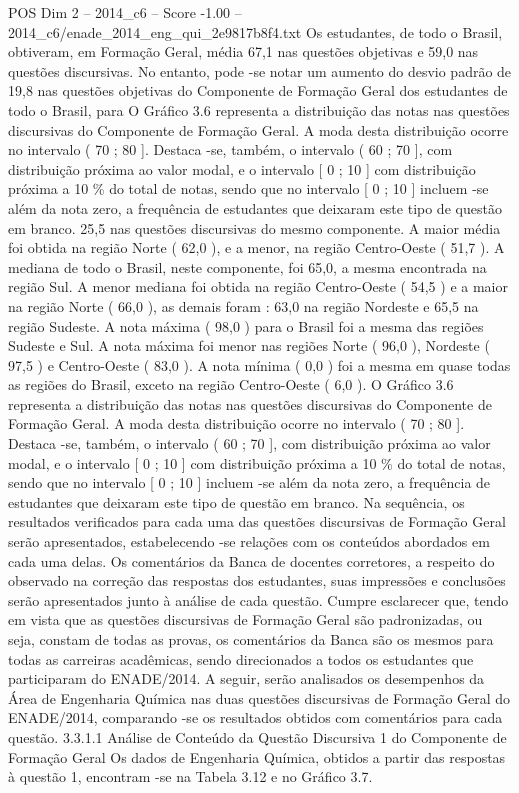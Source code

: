 \begin{textsample}{POS Dim 2 – 2014\_c6 – Score -1.00 – 2014\_c6/enade\_2014\_eng\_qui\_2e9817b8f4.txt}
Os estudantes, de todo o Brasil, obtiveram, em Formação Geral, média 67,1 nas questões objetivas e 59,0 nas questões discursivas.
No entanto, pode -se notar um aumento do desvio padrão de 19,8 nas questões objetivas do Componente de Formação Geral dos estudantes de todo o Brasil, para O Gráfico 3.6 representa a distribuição das notas nas questões discursivas do Componente de Formação Geral.
A moda desta distribuição ocorre no intervalo ( 70 ; 80 ].
Destaca -se, também, o intervalo ( 60 ; 70 ], com distribuição próxima ao valor modal, e o intervalo [ 0 ; 10 ] com distribuição próxima a 10 \% do total de notas, sendo que no intervalo [ 0 ; 10 ] incluem -se além da nota zero, a frequência de estudantes que deixaram este tipo de questão em branco. 25,5 nas questões discursivas do mesmo componente.
A maior média foi obtida na região Norte ( 62,0 ), e a menor, na região Centro-Oeste ( 51,7 ).
A mediana de todo o Brasil, neste componente, foi 65,0, a mesma encontrada na região Sul.
A menor mediana foi obtida na região Centro-Oeste ( 54,5 ) e a maior na região Norte ( 66,0 ), as demais foram : 63,0 na região Nordeste e 65,5 na região Sudeste.
A nota máxima ( 98,0 ) para o Brasil foi a mesma das regiões Sudeste e Sul.
A nota máxima foi menor nas regiões Norte ( 96,0 ), Nordeste ( 97,5 ) e Centro-Oeste ( 83,0 ).
A nota mínima ( 0,0 ) foi a mesma em quase todas as regiões do Brasil, exceto na região Centro-Oeste ( 6,0 ).
O Gráfico 3.6 representa a distribuição das notas nas questões discursivas do Componente de Formação Geral.
A moda desta distribuição ocorre no intervalo ( 70 ; 80 ].
Destaca -se, também, o intervalo ( 60 ; 70 ], com distribuição próxima ao valor modal, e o intervalo [ 0 ; 10 ] com distribuição próxima a 10 \% do total de notas, sendo que no intervalo [ 0 ; 10 ] incluem -se além da nota zero, a frequência de estudantes que deixaram este tipo de questão em branco.
Na sequência, os resultados verificados para cada uma das questões discursivas de Formação Geral serão apresentados, estabelecendo -se relações com os conteúdos abordados em cada uma delas.
Os comentários da Banca de docentes corretores, a respeito do observado na correção das respostas dos estudantes, suas impressões e conclusões serão apresentados junto à análise de cada questão.
Cumpre esclarecer que, tendo em vista que as questões discursivas de Formação Geral são padronizadas, ou seja, constam de todas as provas, os comentários da Banca são os mesmos para todas as carreiras acadêmicas, sendo direcionados a todos os estudantes que participaram do ENADE/2014.
A seguir, serão analisados os desempenhos da Área de Engenharia Química nas duas questões discursivas de Formação Geral do ENADE/2014, comparando -se os resultados obtidos com comentários para cada questão. 3.3.1.1 Análise de Conteúdo da Questão Discursiva 1 do Componente de Formação Geral Os dados de Engenharia Química, obtidos a partir das respostas à questão 1, encontram -se na Tabela 3.12 e no Gráfico 3.7.

\end{textsample}
